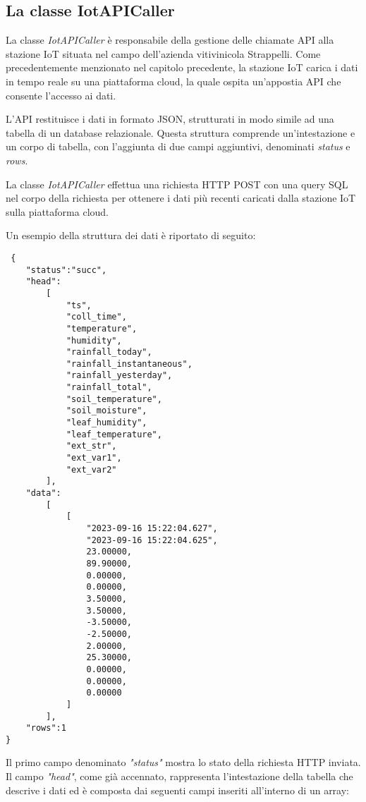 \subsection{La classe IotAPICaller}

La classe \textit{IotAPICaller} è responsabile della gestione delle chiamate API alla stazione IoT situata nel campo dell'azienda vitivinicola Strappelli. Come precedentemente menzionato nel capitolo precedente, la stazione IoT carica i dati in tempo reale su una piattaforma cloud, la quale ospita un'appostia API che consente l'accesso ai dati.

L'API restituisce i dati in formato JSON, strutturati in modo simile ad una tabella di un database relazionale. Questa struttura comprende un'intestazione e un corpo di tabella, con l'aggiunta di due campi aggiuntivi, denominati \textit{status} e \textit{rows}.

La classe \textit{IotAPICaller} effettua una richiesta HTTP POST con una query SQL nel corpo della richiesta per ottenere i dati più recenti caricati dalla stazione IoT sulla piattaforma cloud.

Un esempio della struttura dei dati è riportato di seguito:

\begin{lstlisting}
 {
    "status":"succ",
    "head":
        [
            "ts",
            "coll_time",
            "temperature",
            "humidity",
            "rainfall_today",
            "rainfall_instantaneous",
            "rainfall_yesterday",
            "rainfall_total",
            "soil_temperature",
            "soil_moisture",
            "leaf_humidity",
            "leaf_temperature",
            "ext_str",
            "ext_var1",
            "ext_var2"
        ],
    "data":
        [
            [
                "2023-09-16 15:22:04.627",
                "2023-09-16 15:22:04.625",
                23.00000,
                89.90000,
                0.00000,
                0.00000,
                3.50000,
                3.50000,
                -3.50000,
                -2.50000,
                2.00000,
                25.30000,
                0.00000,
                0.00000,
                0.00000
            ]
        ],
    "rows":1
}
\end{lstlisting}

Il primo campo denominato \textit{"status"} mostra lo stato della richiesta HTTP inviata.
Il campo \textit{"head"}, come già accennato, rappresenta l'intestazione della tabella che descrive i dati ed è composta dai seguenti campi inseriti all'interno di un array:

